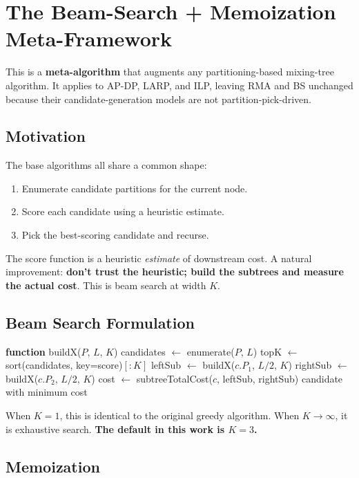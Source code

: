 \section{The Beam-Search + Memoization Meta-Framework}
\label{sec:beam_search}

This is a \textbf{meta-algorithm} that augments any partitioning-based mixing-tree algorithm. It applies to AP-DP, LARP, and ILP, leaving RMA and BS unchanged because their candidate-generation models are not partition-pick-driven.

\subsection{Motivation}

The base algorithms all share a common shape:
\begin{enumerate}
    \item Enumerate candidate partitions for the current node.
    \item Score each candidate using a heuristic estimate.
    \item Pick the best-scoring candidate and recurse.
\end{enumerate}

The score function is a heuristic \textit{estimate} of downstream cost. A natural improvement: \textbf{don't trust the heuristic; build the subtrees and measure the actual cost}. This is beam search at width $K$.

\subsection{Beam Search Formulation}

\begin{algorithmic}[1]
\STATE \textbf{function} buildX($P$, $L$, $K$)
\STATE candidates $\gets$ enumerate($P$, $L$)
\STATE topK $\gets$ sort(candidates, key=score)$[:K]$
    \STATE leftSub $\gets$ buildX($c.P_1$, $L/2$, $K$)
    \STATE rightSub $\gets$ buildX($c.P_2$, $L/2$, $K$)
    \STATE cost $\gets$ subtreeTotalCost($c$, leftSub, rightSub)
\ENDFOR
\RETURN candidate with minimum cost
\end{algorithmic}

When $K = 1$, this is identical to the original greedy algorithm. When $K \to \infty$, it is exhaustive search. \textbf{The default in this work is $K = 3$.}

\subsection{Memoization}

